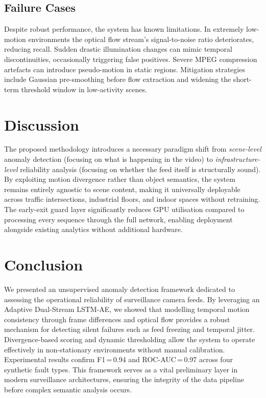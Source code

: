\documentclass[conference]{IEEEtran}
\begin{document}
\subsection{Failure Cases}
Despite robust performance, the system has known limitations.  In
extremely low-motion environments the optical flow stream's
signal-to-noise ratio deteriorates, reducing recall.  Sudden drastic
illumination changes can mimic temporal discontinuities, occasionally
triggering false positives.  Severe MPEG compression artefacts can
introduce pseudo-motion in static regions.  Mitigation strategies include
Gaussian pre-smoothing before flow extraction and widening the short-term
threshold window in low-activity scenes.

\section{Discussion}
The proposed methodology introduces a necessary paradigm shift from
\textit{scene-level} anomaly detection (focusing on what is happening in
the video) to \textit{infrastructure-level} reliability analysis (focusing
on whether the feed itself is structurally sound).  By exploiting motion
divergence rather than object semantics, the system remains entirely
agnostic to scene content, making it universally deployable across traffic
intersections, industrial floors, and indoor spaces without retraining.
The early-exit guard layer significantly reduces GPU utilisation
compared to processing every sequence through the full network, enabling
deployment alongside existing analytics without additional hardware.

\section{Conclusion}
We presented an unsupervised anomaly detection framework dedicated to
assessing the operational reliability of surveillance camera feeds.  By
leveraging an Adaptive Dual-Stream LSTM-AE, we showed that modelling
temporal motion consistency through frame differences and optical flow
provides a robust mechanism for detecting silent failures such as feed
freezing and temporal jitter.  Divergence-based scoring and dynamic
thresholding allow the system to operate effectively in non-stationary
environments without manual calibration.  Experimental results confirm
F1\,=\,0.94 and ROC-AUC\,=\,0.97 across four synthetic fault types.
This framework serves as a vital preliminary layer in modern surveillance
architectures, ensuring the integrity of the data pipeline before complex
semantic analysis occurs.
\end{document}
